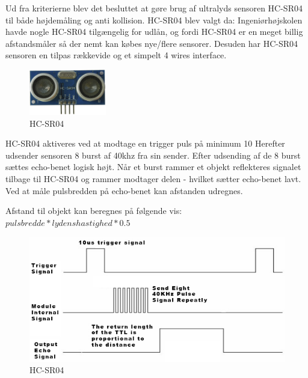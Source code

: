\vspace{0.5cm}

Ud fra kriterierne blev det besluttet at gøre brug af ultralyds sensoren HC-SR04 til både højdemåling og anti kollision. HC-SR04 blev valgt da: Ingeniørhøjskolen havde nogle HC-SR04 tilgængelig for udlån, og fordi HC-SR04 er en meget billig afstandsmåler så der nemt kan købes nye/flere sensorer. Desuden har HC-SR04 sensoren en tilpas rækkevide og et simpelt 4 wires interface. 

\begin{figure}[H]
\centering
\includegraphics[width=0.3\textwidth]{Billeder/Afstandsmaler/ultra_sensor.png}
\caption{HC-SR04}
\label{fig:HC-SR04}
\end{figure}

\newpage

HC-SR04 aktiveres ved at modtage en trigger puls på minimum 10 
Herefter udsender sensoren 8 burst af 40khz fra sin sender. Efter udsending af de 8 burst sættes echo-benet logisk højt. Når et burst rammer et objekt reflekteres signalet tilbage til HC-SR04 og rammer modtager delen - hvilket sætter echo-benet lavt. Ved at måle pulsbredden på echo-benet kan afstanden udregnes. 

Afstand til objekt kan beregnes på følgende vis: $pulsbredde * lydenshastighed * 0.5$

\vspace{0.2cm}

\begin{figure}[H]
\centering
\includegraphics[width=1\textwidth]{Billeder/Afstandsmaler/ultra_schematic.png}
\caption{HC-SR04}
\label{fig:HC-SR04}
\end{figure}

\vspace{2cm}








